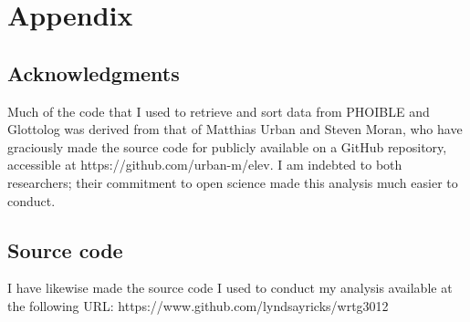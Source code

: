 \documentclass{article}
\begin{document}
\section*{Appendix}

\subsection*{Acknowledgments}

Much of the code that I used to retrieve and sort data from PHOIBLE and Glottolog was derived from that of Matthias Urban and Steven Moran, who have graciously made the source code for \textcite{urban2021} publicly available on a GitHub repository, accessible at https://github.com/urban-m/elev. I am indebted to both researchers; their commitment to open science made this analysis much easier to conduct.

\subsection*{Source code}

I have likewise made the source code I used to conduct my analysis available at the following URL: https://www.github.com/lyndsayricks/wrtg3012

\pagebreak

\printbibliography
\end{document}
